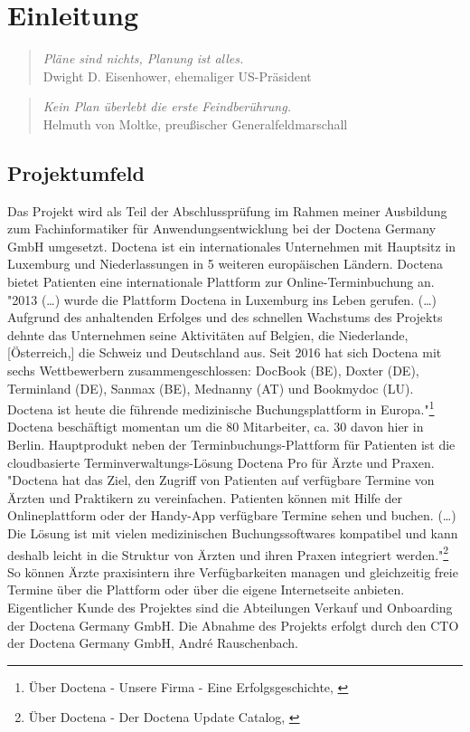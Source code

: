 \section{Einleitung}
\label{sec:Einleitung}
\begin{quote}
\textit{Pläne sind nichts, Planung ist alles.}\\
Dwight D. Eisenhower, ehemaliger US-Präsident
\end{quote}
\begin{quote}
\textit{Kein Plan überlebt die erste Feindberührung.}\\
Helmuth von Moltke, preußischer Generalfeldmarschall
\end{quote}

\subsection{Projektumfeld} 
\label{sec:Projektumfeld}
Das Projekt wird als Teil der Abschlussprüfung im Rahmen meiner Ausbildung zum Fachinformatiker für Anwendungsentwicklung bei der Doctena Germany GmbH umgesetzt. Doctena ist ein internationales Unternehmen mit Hauptsitz in Luxemburg und Niederlassungen in 5 weiteren europäischen Ländern. Doctena bietet Patienten eine internationale Plattform zur Online-Terminbuchung an. "2013 (\dots) wurde die Plattform Doctena in Luxemburg ins Leben gerufen. (\dots) Aufgrund des anhaltenden Erfolges und des schnellen Wachstums des Projekts dehnte das Unternehmen seine Aktivitäten auf Belgien, die Niederlande, [Österreich,] die Schweiz und Deutschland aus. Seit 2016 hat sich Doctena mit sechs Wettbewerbern zusammengeschlossen: DocBook (BE), Doxter (DE), Terminland (DE), Sanmax (BE), Mednanny (AT) und Bookmydoc (LU). Doctena ist heute die führende medizinische Buchungsplattform in Europa."\footnote{Über Doctena - Unsere Firma - Eine Erfolgsgeschichte, \cite{wwwDoctenaComOne}} Doctena beschäftigt momentan um die 80 Mitarbeiter, ca. 30 davon hier in Berlin. Hauptprodukt neben der Terminbuchungs-Plattform für Patienten ist die cloudbasierte Terminverwaltungs-Lösung Doctena Pro für Ärzte und Praxen. "Doctena hat das Ziel, den Zugriff von Patienten auf verfügbare Termine von Ärzten und Praktikern zu vereinfachen. Patienten können mit Hilfe der Onlineplattform oder der Handy-App verfügbare Termine sehen und buchen. (\dots) Die Lösung ist mit vielen medizinischen Buchungssoftwares kompatibel und kann deshalb leicht in die Struktur von Ärzten und ihren Praxen integriert werden."\footnote{Über Doctena - Der Doctena Update Catalog, \cite{wwwDoctenaComTwo}} So können Ärzte praxisintern ihre Verfügbarkeiten managen und gleichzeitig freie Termine über die Plattform oder über die eigene Internetseite anbieten.
Eigentlicher Kunde des Projektes sind die Abteilungen Verkauf und Onboarding der Doctena Germany GmbH. Die Abnahme des Projekts erfolgt durch den \ac{CTO} der Doctena Germany GmbH, André Rauschenbach.

